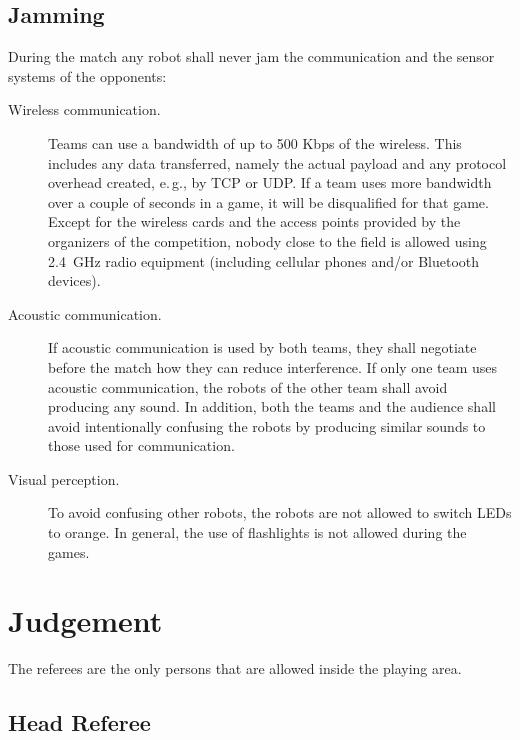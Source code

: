 \documentclass[12pt]{article}
\newcommand{\eg}{\mbox{e.\,g.}\xspace}
\begin{document}
\subsection{Jamming}

During the match any robot shall never jam the communication and the sensor systems of the opponents:

\begin{description}

\item[Wireless communication.] Teams can use a bandwidth of up to 500 Kbps of the wireless. This includes any data transferred, namely the actual payload and any protocol overhead created, \eg, by TCP or UDP. If a team uses more bandwidth over a couple of seconds in a game, it will be disqualified for that game. Except for the wireless cards and the access points provided by the organizers of the competition, nobody close to the field is allowed using 2.4~GHz radio equipment (including cellular phones and/or Bluetooth devices).

\item[Acoustic communication.] If acoustic communication is used by both teams, they shall negotiate before the match how they can reduce interference. If only one team uses acoustic communication, the robots of the other team shall avoid producing any sound. In addition, both the teams and the audience shall avoid intentionally confusing the robots by producing similar sounds to those used for communication.

\item[Visual perception.] To avoid confusing other robots, the robots are not allowed to switch LEDs to orange. In general, the use of flashlights is not allowed during the games.

\end{description}

\section{Judgement}

The referees are the only persons that are allowed inside the playing area.

\subsection{Head Referee}
\end{document}
